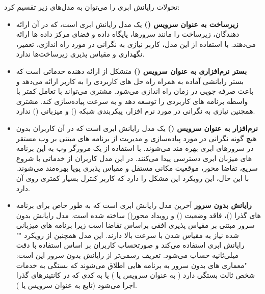تحولات رایانش ابری را می‌توان به مدل‌های زیر تقسیم کرد:

\begin{itemize}
	
	\item \textbf{زیرساخت به عنوان سرویس ()} یک مدل رایانش ابری است، که در آن ارائه دهندگان، زیرساخت را مانند سرورها، پایگاه داده و فضای مرکز داده ها ارائه می‌دهند. با استفاده از این مدل، کاربر نیازی به نگرانی در مورد راه اندازی، تعمیر، نگهداری و مقیاس پذیری زیرساخت‌ها ندارد.
	
	\item \textbf{بستر نرم‌افزاری به عنوان سرویس ()} متشکل از ارائه دهنده خدماتی است که بستر رایانشی آماده به همراه راه حل های کاربردی را به کاربر ارائه می‌دهد و باعث صرفه جویی در زمان راه اندازی می‌شود. مشتری می‌تواند با تعامل کمتر با واسطه برنامه های کاربردی را توسعه دهد و به سرعت پیاده‌سازی کند. مشتری همچنین نیازی به نگرانی در مورد نرم افزار، پیکربندی شبکه () و میزبانی () ندارد.
	
	\item \textbf{نرم‌افزار به عنوان سرویس ()} یک مدل رایانش ابری است که در آن کاربران بدون هیچ گونه نگرانی در مورد پیاده‌سازی و مدیریت از برنامه های مبتنی بر وب مستقر در سرورهای ابری بهره مند می‌شوند. با استفاده از یک مرورگر وب به این برنامه های میزبان ابری دسترسی پیدا می‌کنند. در این مدل کاربران از خدماتی با شروع سریع، تقاضا محور، موقعیت مکانی مستقل و مقیاس پذیری پویا بهره‌مند می‌شوند. با این حال، این رویکرد این مشکل را دارد که کاربر کنترل بسیار کمتری روی آن دارد.
	
	\item \textbf{رایانش بدون سرور} آخرین مدل رایانش ابری است که به طور خاص برای برنامه های گذرا ()، فاقد وضعیت () و رویداد محور() ساخته شده است. مدل رایانش بدون سرور مبتنی بر مقیاس پذیری افقی براساس تقاضا است زیرا برنامه های میزبانی شده نیاز به مقیاس شدن با سرعت بالا دارند. این مدل همچنین از رویکرد "" رایانش ابری استفاده می‌کند و صورتحساب کاربران بر اساس استفاده با دقت میلی‌ثانیه حساب می‌شود. تعریف رسمی‌تر از رایانش بدون سرور این است: "معماری های بدون سرور به برنامه هایی اطلاق می‌شوند که بستگی به خدمات شخص ثالث بستگی دارد ( به عنوان سرویس یا ) یا به کدی که در کانتینرهای گذرا اجرا می‌شود (تابع به عنوان سرویس یا ).
	
\end{itemize}

